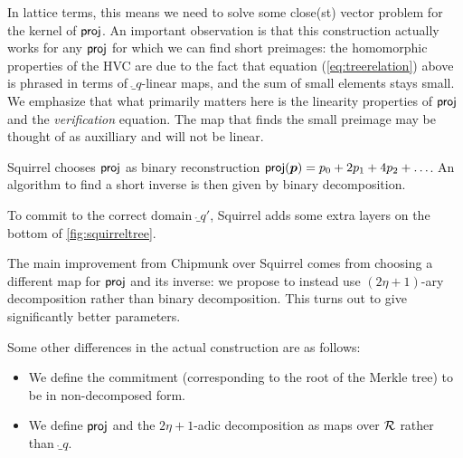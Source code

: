 In lattice terms, this means we need to solve some close(st) vector problem for the kernel of $\mathsf{proj}$.
An important observation is that this construction actually works for any $\mathsf{proj}$ for which we can find short preimages:
the homomorphic properties of the HVC are due to the fact that equation (\ref{eq:treerelation}) above
is phrased in terms of $\ring_q$-linear maps, and the sum of small elements stays small.
We emphasize that what primarily matters here is the linearity properties of $\mathsf{proj}$ and the \emph{verification} equation. The map that finds the small preimage may be thought of as auxilliary and will not be linear.

Squirrel chooses $\mathsf{proj}$ as binary reconstruction $\mathsf{proj}(\boldsymbol{p}) = p_0 + 2p_1 + 4p_2 + \ldots$.
An algorithm to find a short inverse is then given by binary decomposition.

To commit to the correct domain $\ring_{q'}$, Squirrel adds some extra layers on the bottom of \autoref{fig:squirreltree}.

The main improvement from Chipmunk over Squirrel comes from choosing a different map for $\mathsf{proj}$ and its inverse: we propose to instead use $(2\eta+1)$-ary decomposition rather than binary decomposition.
This turns out to give significantly better parameters.

Some other differences in the actual construction are as follows:
\begin{itemize}
 \item We define the commitment (corresponding to the root of the Merkle tree) to be in non-decomposed form.
 \item We define $\mathsf{proj}$ and the $2\eta+1$-adic decomposition as maps over $\mathcal{R}$ rather than $\ring_q$.
\end{itemize}

